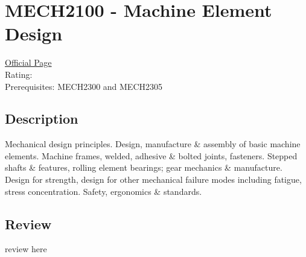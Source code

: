 \hypertarget{MECH2100}{\section{MECH2100 - Machine Element Design}}

\large
\textcolor{turbo_purple}{\href{https://my.uq.edu.au/programs-courses/course.html?course_code=MECH2100}{Official Page}} \\
Rating: \cstar\cstar\cstar\cstar\ostar \\
Prerequisites: MECH2300 and MECH2305

\normalsize
\subsection*{Description}
Mechanical design principles.
Design, manufacture \& assembly of basic machine elements.
Machine frames, welded, adhesive \& bolted joints, fasteners.
Stepped shafts \& features, rolling element bearings; gear mechanics \& manufacture.
Design for strength, design for other mechanical failure modes including fatigue, stress concentration.
Safety, ergonomics \& standards.

\subsection*{Review}
review here
